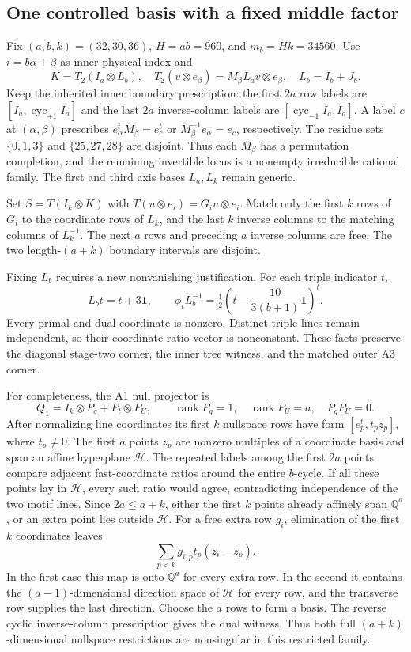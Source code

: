 \subsection{One controlled basis with a fixed middle factor}
Fix $(a,b,k)=(32,30,36)$, $H=ab=960$, and $m_b=Hk=34560$.
Use $i=b\alpha+\beta$ as inner physical index and
\[
 K=T_2(I_a\otimes L_b),\quad
 T_2(v\otimes e_\beta)=M_\beta L_av\otimes e_\beta,
 \quad L_b=I_b+J_b.
\]
Keep the inherited inner boundary prescription: the first $2a$ row
labels are $[I_a,\operatorname{cyc}_{+1}I_a]$ and the last $2a$
inverse-column labels are $[\operatorname{cyc}_{-1}I_a,I_a]$.
A label $c$ at $(\alpha,\beta)$ prescribes
$e_\alpha^tM_\beta=e_c^t$ or $M_\beta^{-1}e_\alpha=e_c$,
respectively. The residue sets $\{0,1,3\}$ and $\{25,27,28\}$ are
disjoint. Thus each $M_\beta$ has a permutation completion, and the
remaining invertible locus is a nonempty irreducible rational family.
The first and third axis bases $L_a,L_k$ remain generic.

Set $S=T(I_k\otimes K)$ with
$T(u\otimes e_i)=G_i u\otimes e_i$. Match only the first $k$ rows
of $G_i$ to the coordinate rows of $L_k$, and the last $k$ inverse
columns to the matching columns of $L_k^{-1}$. The next $a$ rows
and preceding $a$ inverse columns are free. The two length-$(a+k)$
boundary intervals are disjoint.

Fixing $L_b$ requires a new nonvanishing justification. For each triple
indicator $t$,
\[
 L_bt=t+3\mathbf1,\qquad
 \phi_tL_b^{-1}=\tfrac12\left(t-\frac{10}{3(b+1)}\mathbf1\right)^t.
\]
Every primal and dual coordinate is nonzero. Distinct triple lines
remain independent, so their coordinate-ratio vector is nonconstant.
These facts preserve the diagonal stage-two corner, the inner tree
witness, and the matched outer A3 corner.

For completeness, the A1 null projector is
\[
 Q_1=I_k\otimes P_q+P_t\otimes P_U,\qquad
 \operatorname{rank}P_q=1,\quad\operatorname{rank}P_U=a,\quad P_qP_U=0.
\]
After normalizing line coordinates its first $k$ nullspace rows have
form $[e_p^t,t_pz_p]$, where $t_p\ne0$. The first $a$ points $z_p$
are nonzero multiples of a coordinate basis and span an affine
hyperplane $\mathcal H$. The repeated labels among the first $2a$
points compare adjacent fast-coordinate ratios around the entire
$b$-cycle. If all these points lay in $\mathcal H$, every such ratio
would agree, contradicting independence of the two motif lines.
Since $2a\le a+k$, either the first $k$ points already affinely span
$\mathbb Q^a$, or an extra point lies outside $\mathcal H$.
For a free extra row $g_i$, elimination of the first $k$ coordinates
leaves
\[
 \sum_{p<k}g_{i,p}t_p(z_i-z_p).
\]
In the first case this map is onto $\mathbb Q^a$ for every extra row.
In the second it contains the $(a-1)$-dimensional direction space of
$\mathcal H$ for every row, and the transverse row supplies the last
direction. Choose the $a$ rows to form a basis. The reverse cyclic
inverse-column prescription gives the dual witness. Thus both full
$(a+k)$-dimensional nullspace restrictions are nonsingular in this
restricted family.

